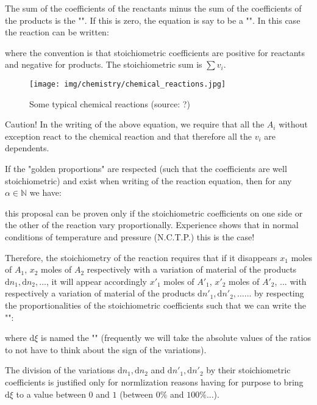 	The sum of the coefficients of the reactants minus the sum of the coefficients of the products is the "\label{stoichiometric sum}". If this is zero, the equation is say to be a "". In this case the reaction can be written:
	
	where the convention is that stoichiometric coefficients are positive for reactants and negative for products. The stoichiometric sum is $\sum v_i$.
	\begin{figure}[H]
		\centering
		\texttt{[image: img/chemistry/chemical\_reactions.jpg]}
		\caption[Some typical chemical reactions]{Some typical chemical reactions (source: ?)}
	\end{figure}
	Caution! In the writing of the above equation, we require that all the $A_i$ without exception react to the chemical reaction and that therefore all the $v_i$ are dependents.
	
	If the "golden proportions" are respected (such that the coefficients are well stoichiometric) and exist when writing of the reaction equation, then for any $\alpha \in \mathbb{N}$ we have:
	
	this proposal can be proven only if the stoichiometric coefficients on one side or the other of the reaction vary proportionally. Experience shows that in normal conditions of temperature and pressure (N.C.T.P.) this is the case!
	
	Therefore, the stoichiometry of the reaction requires that if it disappears $x_1$ moles of $A_1$, $x_2$ moles of $A_2$  respectively with a variation of material of the products $\mathrm{d}n_1,\mathrm{d}n_2,\ldots $, it will appear accordingly ${x'}_1$ moles of ${A'}_1$, ${x'}_2$ moles of ${A'}_2$, ... with respectively a variation of material of the products $\mathrm{d}{n'}_1,\mathrm{d}{n'}_2,\ldots $... by respecting the proportionalities of the stoichiometric coefficients such that we can write the "":
	
	where $\mathrm{d}\xi$ is named the "" (frequently we will take the absolute values of the ratios to not have to think about the sign of the variations).
	
	The division of the variations $\mathrm{d}n_1,\mathrm{d}n_2$ and $\mathrm{d}{n'}_1,\mathrm{d}{n'}_2$  by their stoichiometric coefficients is justified only for normlization reasons having for purpose to bring $\mathrm{d}\xi$ to a value between $0$ and $1$ (between $0\%$ and $100\%$...).
	
